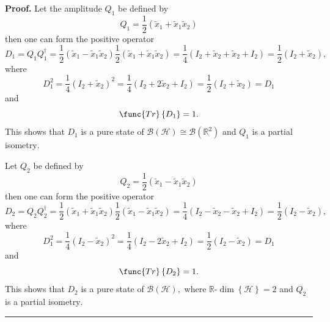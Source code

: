 \documentclass[aps,preprint]{revtex4}
\newenvironment{proof}[1][Proof]{\noindent\textbf{#1.} }{\ \rule{0.5em}{0.5em}}
\begin{document}
\begin{proof}
Let the amplitude $Q_{1}$ be defined by 
\begin{equation}
Q_{1}=\frac{1}{2}\left( \widetilde{x}_{1}+\widetilde{x}_{1}\widetilde{x}%
_{2}\right)
\end{equation}%
then one can form the positive operator 
\begin{equation}
D_{1}=Q_{1}Q_{1}^{\dagger }=\frac{1}{2}\left( \widetilde{x}_{1}-\widetilde{x}%
_{1}\widetilde{x}_{2}\right) \frac{1}{2}\left( \widetilde{x}_{1}+\widetilde{x%
}_{1}\widetilde{x}_{2}\right) =\frac{1}{4}\left( I_{2}+\widetilde{x}_{2}+%
\widetilde{x}_{2}+I_{2}\right) =\frac{1}{2}\left( I_{2}+\widetilde{x}%
_{2}\right) ,
\end{equation}%
where 
\begin{equation}
D_{1}^{2}=\frac{1}{4}\left( I_{2}+\widetilde{x}_{2}\right) ^{2}=\frac{1}{4}%
\left( I_{2}+2\widetilde{x}_{2}+I_{2}\right) =\frac{1}{2}\left( I_{2}+%
\widetilde{x}_{2}\right) =D_{1}
\end{equation}%
and 
\begin{equation}
\func{Tr}\left\{ D_{1}\right\} =1.
\end{equation}%
This shows that $D_{1}$ is a pure state of $\mathcal{B}\left( \mathcal{H}%
\right) \cong \mathcal{B}\left( \mathbb{R}^{2}\right) $ and $Q_{1}$ is a
partial isometry$.$

Let $Q_{2}$ be defined by 
\begin{equation}
Q_{2}=\frac{1}{2}\left( \widetilde{x}_{1}-\widetilde{x}_{1}\widetilde{x}%
_{2}\right)
\end{equation}%
then one can form the positive operator 
\begin{equation}
D_{2}=Q_{2}Q_{2}^{\dagger }=\frac{1}{2}\left( \widetilde{x}_{1}+\widetilde{x}%
_{1}\widetilde{x}_{2}\right) \frac{1}{2}\left( \widetilde{x}_{1}-\widetilde{x%
}_{1}\widetilde{x}_{2}\right) =\frac{1}{4}\left( I_{2}-\widetilde{x}_{2}-%
\widetilde{x}_{2}+I_{2}\right) =\frac{1}{2}\left( I_{2}-\widetilde{x}%
_{2}\right) ,
\end{equation}%
where 
\begin{equation}
D_{1}^{2}=\frac{1}{4}\left( I_{2}-\widetilde{x}_{2}\right) ^{2}=\frac{1}{4}%
\left( I_{2}-2\widetilde{x}_{2}+I_{2}\right) =\frac{1}{2}\left( I_{2}-%
\widetilde{x}_{2}\right) =D_{1}
\end{equation}%
and 
\begin{equation}
\func{Tr}\left\{ D_{2}\right\} =1.
\end{equation}%
This shows that $D_{2}$ is a pure state of $\mathcal{B}\left( \mathcal{H}%
\right) ,$ where $\mathbb{R}$-$\dim \left\{ \mathcal{H}\right\} =2$ and $%
Q_{2}$ is a partial isometry$.$
\end{proof}
\end{document}
